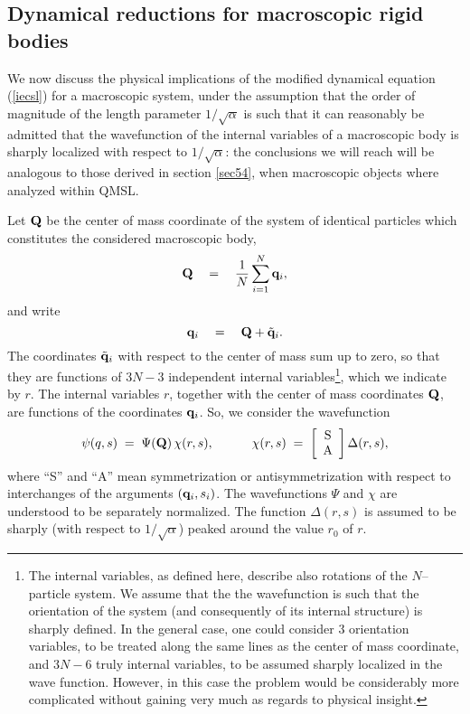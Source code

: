 \documentclass[12pt]{article}
\begin{document}
\subsection{Dynamical reductions for macroscopic rigid bodies}
\label{sec72}

We now discuss the physical implications of the modified dynamical
equation (\ref{iecsl}) for a macroscopic system, under the
assumption that the order of magnitude of the length parameter
$1/\sqrt{\alpha}$ is such that it can reasonably be admitted that
the wavefunction of the internal variables of a macroscopic body
is sharply localized with respect to $1/\sqrt{\alpha}$: the
conclusions we will reach will be analogous to those derived in
section \ref{sec54}, when macroscopic objects where analyzed
within QMSL.

Let ${\bf Q}$ be the center  of mass coordinate of the system of
identical particles which constitutes the considered macroscopic
body,
\[
{\bf Q} \quad = \quad \frac{1}{N} \sum_{i=1}^{N} {\bf q}_{i},
\]
and write
\[
{\bf q}_{i} \quad = \quad {\bf Q} + \tilde{\bf q}_{i}.
\]
The coordinates $\tilde{\bf q}_{i}$ with respect to the center of
mass sum up to zero, so that they are functions of $3N - 3$
independent internal variables\footnote{The internal variables, as
defined here, describe also rotations of the $N$--particle system.
We assume that the the wavefunction is such that the orientation
of the system (and consequently of its internal structure) is
sharply defined. In the general case, one could consider $3$
orientation variables, to be treated along the same lines as the
center  of mass coordinate, and $3N - 6$ truly internal variables,
to be assumed sharply localized in the wave function. However, in
this case the problem would be considerably more complicated
without gaining very much as regards to physical insight.}, which
we indicate by $r$. The internal variables $r$, together with the
center of mass coordinates ${\bf Q}$, are functions of the
coordinates ${\bf q}_{i}$.  So, we consider the wavefunction
\begin{equation} \label{wfrb}
\psi (q, s) \; = \; \Psi ({\bf Q})\, \chi (r, s), \qquad \quad
\chi (r, s) \; = \; \left[
\begin{array}{c}
\makebox{S} \\ \makebox{A}
\end{array}
\right] \Delta (r, s),
\end{equation}
where ``S'' and ``A'' mean symmetrization or antisymmetrization
with respect to interchanges of the arguments $({\bf q}_{i},
s_{i})$. The wavefunctions $\Psi$ and $\chi$ are understood to be
separately normalized. The function $\Delta (r, s)$ is assumed to
be sharply (with respect to $1/\sqrt{\alpha}$) peaked around the
value $r_{0}$ of $r$.
\end{document}
